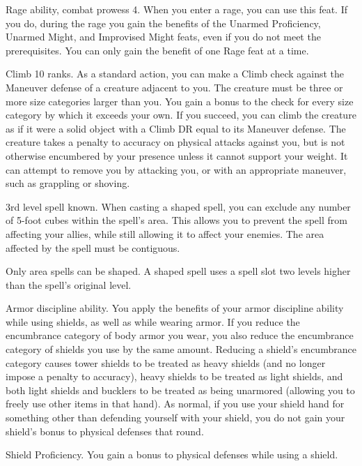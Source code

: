 \featpres Rage ability, combat prowess 4.
\featben When you enter a rage, you can use this feat.
If you do, during the rage you gain the benefits of the Unarmed Proficiency, Unarmed Might, and Improvised Might feats, even if you do not meet the prerequisites.
 You can only gain the benefit of one Rage feat at a time.

\featpre Climb 10 ranks.
\featben As a standard action, you can make a Climb check against the Maneuver defense of a creature adjacent to you.
The creature must be three or more size categories larger than you.
You gain a  bonus to the check for every size category by which it exceeds your own.
If you succeed, you can climb the creature as if it were a solid object with a Climb DR equal to its Maneuver defense.
The creature takes a  penalty to accuracy on physical attacks against you, but is not otherwise encumbered by your presence unless it cannot support your weight.
It can attempt to remove you by attacking you, or with an appropriate maneuver, such as grappling or shoving.

\featpre 3rd level spell known.
\featben When casting a shaped spell, you can exclude any number of 5-foot cubes within the spell's area.
This allows you to prevent the spell from affecting your allies, while still allowing it to affect your enemies.
The area affected by the spell must be contiguous.

Only area spells can be shaped.
A shaped spell uses a spell slot two levels higher than the spell's original level.

\featpre Armor discipline ability.
\featben You apply the benefits of your armor discipline ability while using shields, as well as while wearing armor.
If you reduce the encumbrance category of body armor you wear, you also reduce the encumbrance category of shields you use by the same amount.
Reducing a shield's encumbrance category causes tower shields to be treated as heavy shields (and no longer impose a  penalty to accuracy), heavy shields to be treated as light shields, and both light shields and bucklers to be treated as being unarmored (allowing you to freely use other items in that hand).
As normal, if you use your shield hand for something other than defending yourself with your shield, you do not gain your shield's bonus to physical defenses that round.

\featpre Shield Proficiency.
\featben You gain a  bonus to physical defenses while using a shield.

